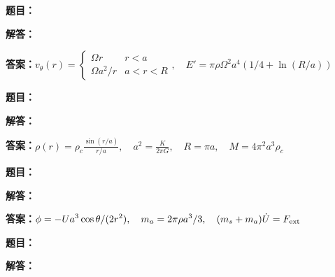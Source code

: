 \documentclass[lang=cn,color=blue,11pt]{elegantbook}
\begin{document}
\par\smallskip\noindent\hrulefill\par\medskip
{}\par
\noindent\textbf{题目：}
\par\noindent\textbf{解答：}
\par\noindent\textbf{答案：}\(\displaystyle v_\theta(r)=\begin{cases}\Omega r&r<a\\\Omega a^2/r&a<r<R\end{cases},\quad E'=\pi\rho\Omega^2a^4(1/4+\ln(R/a))\)\par
\par\smallskip\noindent\hrulefill\par\medskip
{}\par
\noindent\textbf{题目：}
\par\noindent\textbf{解答：}
\par\noindent\textbf{答案：}\(\displaystyle \rho(r)=\rho_c\frac{\sin(r/a)}{r/a},\quad a^2=\frac{K}{2\pi G},\quad R=\pi a,\quad M=4\pi^2a^3\rho_c\)\par
\par\smallskip\noindent\hrulefill\par\medskip
{}\par
\noindent\textbf{题目：}
\par\noindent\textbf{解答：}
\par\noindent\textbf{答案：}\(\displaystyle \phi=-Ua^3\cos\theta/(2r^2),\quad m_a=2\pi\rho a^3/3,\quad (m_s+m_a)\dot U=F_{\rm ext}\)\par
\par\smallskip\noindent\hrulefill\par\medskip
{}\par
\noindent\textbf{题目：}
\par\noindent\textbf{解答：}
\end{document}
